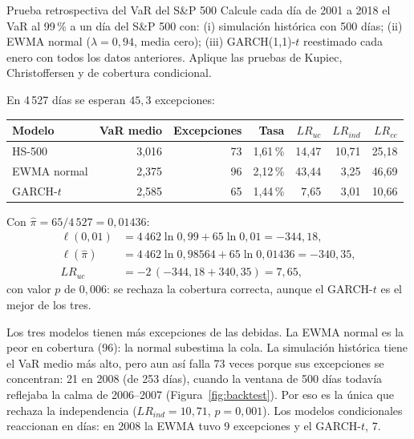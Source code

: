 \begin{ejresuelto}{Prueba retrospectiva del VaR del S\&P 500}\label{ej:backtest}
\enunciado Calcule cada día de 2001 a 2018 el VaR al 99\,\% a un día del S\&P 500 con: (i) simulación histórica con 500
días; (ii) EWMA normal ($\lambda=0{,}94$, media cero); (iii) GARCH(1,1)-$t$ reestimado cada enero con todos los datos
anteriores. Aplique las pruebas de Kupiec, Christoffersen y de cobertura condicional.

\solucion
{} En 4\,527 días se esperan $45{,}3$ excepciones:
\begin{center}\small
\begin{tabular}{@{}lrrrrrr@{}}
\toprule
Modelo & VaR medio & Excepciones & Tasa & $LR_{uc}$ & $LR_{ind}$ & $LR_{cc}$ \\
\midrule
HS-500      & 3,016 & 73 & 1,61\,\% & 14,47 & 10,71 & 25,18 \\
EWMA normal & 2,375 & 96 & 2,12\,\% & 43,44 & 3,25 & 46,69 \\
GARCH-$t$   & 2,585 & 65 & 1,44\,\% & 7,65 & 3,01 & 10,66 \\
\bottomrule
\end{tabular}
\end{center}

 Con $\hat\pi=65/4\,527=0{,}01436$:
\begin{align*}
  \ell(0{,}01) &= 4\,462\ln0{,}99+65\ln0{,}01=-344{,}18,\\
  \ell(\hat\pi) &= 4\,462\ln0{,}98564+65\ln0{,}01436=-340{,}35,\\
  LR_{uc} &= -2\,(-344{,}18+340{,}35)=7{,}65,
\end{align*}
con valor $p$ de $0{,}006$: se rechaza la cobertura correcta, aunque el GARCH-$t$ es el mejor de los tres.

 Los tres modelos tienen más excepciones de las debidas. La EWMA normal es la peor en
cobertura (96): la normal subestima la cola. La simulación histórica tiene el VaR medio más alto, pero aun así
falla 73 veces porque sus excepciones se concentran: 21 en 2008 (de 253 días), cuando la ventana de 500 días todavía
reflejaba la calma de 2006--2007 (Figura~\ref{fig:backtest}). Por eso es la única que rechaza la independencia
($LR_{ind}=10{,}71$, $p=0{,}001$). Los modelos condicionales reaccionan en días: en 2008 la EWMA tuvo 9 excepciones y
el GARCH-$t$, 7.



\end{ejresuelto}
